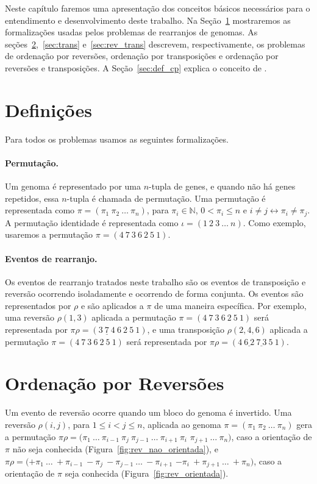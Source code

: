 Neste capítulo faremos uma apresentação dos conceitos básicos
necessários para o entendimento e desenvolvimento deste trabalho. Na
Seção~\ref{sec:defin} mostraremos as formalizações usadas pelos
problemas de rearranjos de genomas. As
seções~\ref{sec:rev},~\ref{sec:trans} e~\ref{sec:rev_trans} descrevem,
respectivamente, os problemas de ordenação por reversões, ordenação por
transposições e ordenação por reversões e transposições. A
Seção~\ref{sec:def_cp} explica o conceito de \pr{}.

\section{Definições}
\label{sec:defin}
Para todos os problemas usamos as seguintes formalizações.

\paragraph{Permutação.} Um genoma é representado por uma $n$-tupla de
genes, e quando não há genes repetidos, essa $n$-tupla é chamada de
permutação. Uma permutação é representada como $\pi =
(\pi_{1}~\pi_{2}~\ldots~\pi_{n})$, para $\pi_{i} \in \mathbb{N}$, $0 <
\pi_{i} \leq n$ e $i \neq j \leftrightarrow \pi_{i} \neq \pi_{j}$. A
permutação identidade é representada como $\iota = (1~2~3~\ldots~n)$.
Como exemplo, usaremos a permutação $\pi = (4~7~3~6~2~5~1)$.

\paragraph{Eventos de rearranjo.} Os eventos de rearranjo tratados neste
trabalho são os eventos de transposição e reversão ocorrendo
isoladamente e ocorrendo de forma conjunta. Os eventos são representados
por $\rho$ e são aplicados a $\pi$ de uma maneira específica. Por
exemplo, uma reversão $\rho(1, 3)$ aplicada a permutação $\pi =
(4~7~3~6~2~5~1)$ será representada por $\pi\rho =
(\underline{3~7~4}~6~2~5~1)$, e uma transposição $\rho(2,4,6)$ aplicada
a permutação $\pi = (4~7~3~6~2~5~1)$ será representada por $\pi\rho =
(4~\underline{6~2}~\underline{7~3}~5~1)$.

\section{Ordenação por Reversões}
\label{sec:rev}
Um evento de reversão ocorre quando um bloco do genoma é invertido. Uma
reversão $\rho(i, j)$, para $1 \leq i < j \leq n$, aplicada ao genoma
$\pi = (\pi_{1}~\pi_{2}~\ldots~\pi_{n})$ gera a permutação $\pi\rho =
(\pi_{1}~\ldots~\pi_{i-1}~\pi_{j}~\pi_{j-1}~\ldots~\pi_{i+1}~\pi_{i}$
$\pi_{j+1}~\ldots~\pi_{n})$, caso a orientação de $\pi$ não seja
conhecida (Figura~\ref{fig:rev_nao_orientada}), e $\pi\rho =
(+\pi_{1}~\ldots~+\pi_{i-1}~-\pi_{j}~-\pi_{j-1}~\ldots~-\pi_{i+1}$
$-\pi_{i}~+\pi_{j+1}~\ldots~+\pi_{n})$, caso a orientação de $\pi$ seja
conhecida (Figura~\ref{fig:rev_orientada}).

